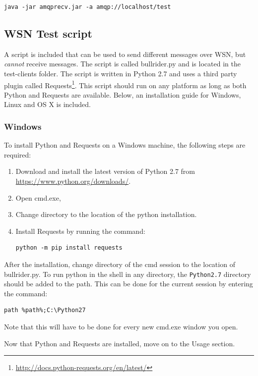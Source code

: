 \begin{verbatim}
java -jar amqprecv.jar -a amqp://localhost/test
\end{verbatim}

\subsection{WSN Test script}
\label{WSN_Test_Script}
A script is included that can be used to send different messages over WSN, but \textit{cannot} receive messages. The script is called bullrider.py and is located in the test-clients folder. The script is written in Python 2.7 and uses a third party plugin called Requests\footnote{\url{http://docs.python-requests.org/en/latest/}}. This script should run on any platform as long as both Python and Requests are available. Below, an installation guide for Windows, Linux and OS X is included.

\subsubsection{Windows}
\label{windows_install_wsn}
To install Python and Requests on a Windows machine, the following steps are required:

\begin{enumerate}
\setlength{\itemsep}{0cm}%
    \item Download and install the latest version of Python 2.7 from \url{https://www.python.org/downloads/}.
    \item Open cmd.exe,
    \item Change directory to the location of the python installation. 
    \item Install Requests by running the command: \begin{verbatim}python -m pip install requests \end{verbatim}
\end{enumerate}

After the installation, change directory of the cmd session to the location of bullrider.py. To run python in the shell in any directory, the \verb!Python2.7! directory should be added to the path. This can be done for the current session by entering the command: 
\begin{verbatim}
path %path%;C:\Python27
\end{verbatim}
Note that this will have to be done for every new cmd.exe window you open.

Now that Python and Requests are installed, move on to the Usage section.

